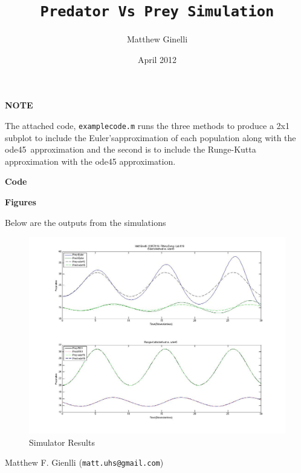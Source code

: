\documentclass{article}
\title{\texttt{Predator Vs Prey Simulation}}
\author{Matthew Ginelli}
\date{April 2012}
\begin{document}
\maketitle

\textbf{NOTE}

The attached code, \texttt{examplecode.m} runs the three methods to produce a 2x1 subplot to include the Euler'sapproximation of each population along with the ode45~approximation and the second is to include the Runge-Kutta approximation with the ode45 approximation.

\medskip

\textbf{Code}


\textbf{Figures}

Below are the outputs from the simulations

\begin{figure}[ht]
\centering
    \includegraphics[width=\textwidth,height=\textheight,keepaspectratio]{example.jpg}%
    \caption{Simulator Results}
    \label{fig:example}
\end{figure}


Matthew F. Gienlli (\texttt{matt.uhs@gmail.com})
\end{document}
